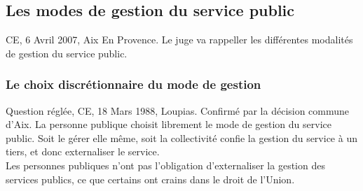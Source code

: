 \documentclass[10pt, a4paper, openany]{book}
\begin{document}
\subsection{Les modes de gestion du service public}

CE, 6 Avril 2007, Aix En Provence. Le juge va rappeller les différentes modalités de gestion du service public. 

\subsubsection{Le choix discrétionnaire du mode de gestion}

Question réglée, CE, 18 Mars 1988, Loupias. Confirmé par la décision commune d'Aix. La personne publique choisit librement le mode de gestion du service public. Soit le gérer elle même, soit la collectivité confie la gestion du service à un tiers, et donc externaliser le service. \\
Les personnes publiques n'ont pas l'obligation d'externaliser la gestion des services publics, ce que certains ont crains dans le droit de l'Union.
\end{document}

